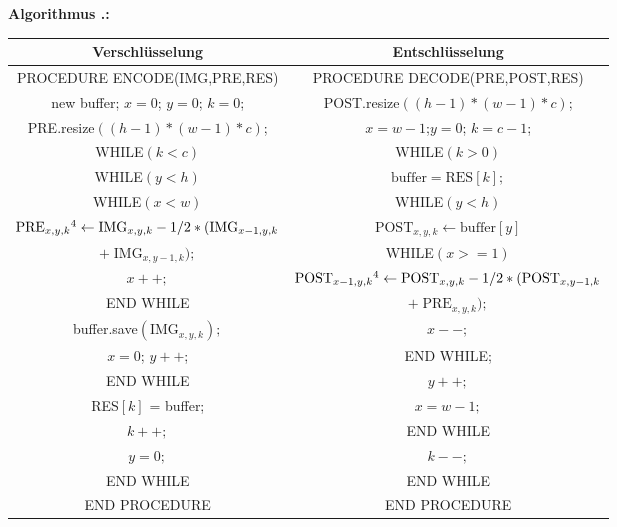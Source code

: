 \documentclass[a4paper,12pt]{article}
\newcounter{Algorithmus}
\newenvironment{Algorithmus}{
\medskip
        
        \setlength{\parindent}{0pt}
        \addtocounter{Algorithmus}{1}
        \textbf{\textsf{Algorithmus \thesubsection.\theAlgorithmus}:}}{
        \nopagebreak
        \vspace{-1.0ex}
        \bigskip
        
}
\begin{document}
\begin{Algorithmus}
\\
\begin{tabular}{c|c}
Verschlüsselung & Entschlüsselung
\\
\hline
PROCEDURE ENCODE(IMG,PRE,RES) & PROCEDURE DECODE(PRE,POST,RES)
\\
new buffer; $x=0$; $y=0$; $k=0$; & POST.resize$((h-1)*(w-1)*c)$;
\\
PRE.resize$((h-1)*(w-1)*c)$; & $x=w-1$;$y=0$; $k=c-1$;
\\
WHILE$(k < c)$ &                  WHILE$(k > 0)$
\\
WHILE$(y < h)$ &               $\text{buffer} = \text{RES}[k];$
\\
WHILE$(x < w)$ &              WHILE$(y<h)$
\\
$\text{PRE}_{x,y,k}\footnotemark[4]\leftarrow \text{IMG}_{x,y,k} - 1/2 *(\text{IMG}_{x-1,y,k}$ &  $\text{POST}_{x,y,k}\leftarrow \text{buffer}[y]$
\\
$+\;\text{IMG}_{x,y-1,k});$  & WHILE$(x>=1)$
\\
$x++;$ &  $\text{POST}_{x-1,y,k}\footnotemark[4]\leftarrow \text{POST}_{x,y,k} - 1/2* (\text{POST}_{x,y-1,k}$  
\\
END WHILE  & $+\;\text{PRE}_{x,y,k});$
\\
buffer.save$(\text{IMG}_{x,y,k});$  & $x--;$
\\
$x=0$; $y++$;  &   END WHILE; 
\\
END WHILE   & $y++;$ 
\\
RES$[k]$ = buffer;  & $x=w-1;$ 
\\
$k++;$   &  END WHILE   
\\
$y=0;$ &   $k--;$
\\
END WHILE & END WHILE 
\\
END PROCEDURE & END PROCEDURE
\end{tabular}
\end{Algorithmus}
\end{document}
